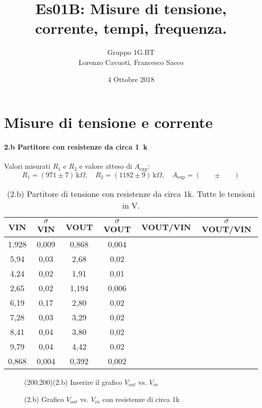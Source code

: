 \documentclass[10pt,a4paper]{article}
\author{Gruppo 1G.BT \\ Lorenzo Cavuoti, Francesco Sacco}
\title{Es01B: Misure di tensione, corrente, tempi, frequenza.}
\newcommand{\exn}{\phantom{xxx}}
\begin{document}
\date{4 Ottobre 2018}
\maketitle

\setcounter{section}{1}
\section{Misure di tensione e corrente}

\paragraph{2.b Partitore con resistenze da circa 1~k}
Valori misurati $R_1$ e $R_2$ e valore atteso di $A_\mathrm{exp}$:
\[
R_1 = ( 971 \pm 7 ) \,\mathrm{k}\Omega, \quad
R_2 = ( 1182 \pm 9 ) \,\mathrm{k}\Omega, \quad
A_\mathrm{exp} = ( \exn \pm \exn ) 
\]


\begin{table}[h]
\centering
\begin{tabular}{|c|c|c|c|c|c|}
\hline 
VIN& $\sigma$ VIN  &VOUT	 & $\sigma$ VOUT& VOUT/VIN & $\sigma$ VOUT/VIN \\
\hline 
1,928 & 0,009 & 0,868 & 0,004 & \exn &\exn \\
5,94 & 0,03 & 2,68 & 0,02 & \exn &\exn \\
4,24 & 0,02 & 1,91 & 0,01 & \exn &\exn \\
2,65 & 0,02 & 1,194 & 0,006 & \exn &\exn \\
6,19 & 0,17 & 2,80 & 0,02 & \exn &\exn \\
7,28 & 0,03 & 3,29 & 0,02 & \exn &\exn \\
8,41 & 0,04 & 3,80 & 0,02 & \exn &\exn \\
9,79 & 0,04 & 4,42 & 0,02 & \exn &\exn \\
0,868 & 0,004 & 0,392 & 0,002 & \exn &\exn \\
\hline 
\end{tabular} 
\caption{(2.b) Partitore di tensione con resistenze da circa 1k. Tutte le tensioni in V.\label{t:par1}}
\end{table}


\begin{figure}[h]
\centering
\framebox(200,200){(2.b) Inserire il grafico $V_{out}$ vs. $V_{in}$ }

\caption{(2.b) Grafico $V_{out}$ vs. $V_{in}$ con resistenze di circa 1k \label{f:par1}}
\end{figure}
\end{document}
